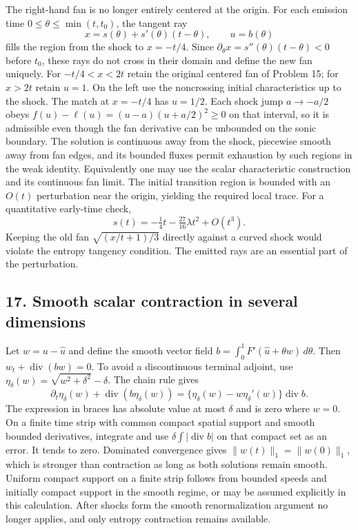 The right-hand fan is no longer entirely centered at the origin.
For each emission time $0\le\theta\le\min(t,t_0)$, the tangent ray
\[
 x=s(\theta)+s'(\theta)(t-\theta),\qquad u=b(\theta)
\]
 fills the region from the shock to $x=-t/4$. Since
$\partial_\theta x=s''(\theta)(t-\theta)<0$ before $t_0$, these
rays do not cross in their domain and define the new fan uniquely.
For $-t/4<x<2t$ retain the original centered fan of Problem 15;
for $x>2t$ retain $u=1$. On the left use the noncrossing initial
characteristics up to the shock. The match at $x=-t/4$ has $u=1/2$.
Each shock jump $a\to-a/2$ obeys
$f(u)-\ell(u)=(u-a)(u+a/2)^2\ge0$ on that interval,
so it is admissible even though the fan derivative can be unbounded
on the sonic boundary. The solution is continuous away from the
shock, piecewise smooth away from fan edges, and its bounded fluxes
permit exhaustion by such regions in the weak identity. Equivalently
one may use the scalar characteristic construction and its continuous
fan limit. The initial transition region is bounded with an $O(t)$
perturbation near the origin, yielding the required local trace.
For a quantitative early-time check,
\[
 s(t)=-\tfrac14t-\tfrac{27}{16}\lambda t^2+O(t^3).
\]
Keeping the old fan $\sqrt{(x/t+1)/3}$ directly against a curved
shock would violate the entropy tangency condition. The emitted
rays are an essential part of the perturbation.

\subsection*{17. Smooth scalar contraction in several dimensions}
Let $w=u-\widehat u$ and define the smooth vector field
$b=\int_0^1F'(\widehat u+\theta w)\,d\theta$.
Then $w_t+\operatorname{div}(bw)=0$.
To avoid a discontinuous terminal adjoint, use
$\eta_\delta(w)=\sqrt{w^2+\delta^2}-\delta$.
The chain rule gives
\[
 \partial_t\eta_\delta(w)+\operatorname{div}(b\eta_\delta(w))
 =\{\eta_\delta(w)-w\eta_\delta'(w)\}\operatorname{div}b.
\]
The expression in braces has absolute value at most $\delta$ and
is zero where $w=0$. On a finite time strip with common compact
spatial support and smooth bounded derivatives, integrate and use
$\delta\int|\operatorname{div}b|$ on that compact set as an error.
It tends to zero. Dominated convergence gives
$\|w(t)\|_1=\|w(0)\|_1$, which is stronger than contraction as long
as both solutions remain smooth. Uniform compact support on a finite
strip follows from bounded speeds and initially compact support in
the smooth regime, or may be assumed explicitly in this calculation.
After shocks form the smooth renormalization argument no longer
applies, and only entropy contraction remains available.
